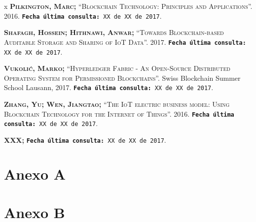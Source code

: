 \documentclass[12pt,a4paper, twoside]{report}
\makeatletter
\newcommand{\blankpage}{
				\newpage
				\thispagestyle{empty}
				\mbox{}
				\newpage
				}
\let\plainappendixpage\appendixpage
\renewcommand{\appendixpage}{%
  \begingroup
  \let\ps@plain\ps@empty
  \plainappendixpage
  \endgroup}
\makeatother
\begin{document}
\begin{thebibliography} {x}
		 \textsc{\textbf{Pilkington, Marc; }}\textsc{“Blockchain Technology: Principles and Applications”.} 2016.
		\newline \texttt{\textbf{Fecha última consulta:} XX de XX de 2017}.
		
		 \textsc{\textbf{Shafagh, Hossein; Hithnawi, Anwar; }}\textsc{“Towards Blockchain-based Auditable Storage and Sharing of IoT Data”.} 2017.
		\newline \texttt{\textbf{Fecha última consulta:} XX de XX de 2017}.
		
		 \textsc{\textbf{Vukolić, Marko; }}\textsc{“Hyperledger Fabric - An Open-Source Distributed Operating System for Permissioned Blockchains”.} Swiss Blockchain Summer School Lausann, 2017.
		\newline \texttt{\textbf{Fecha última consulta:} XX de XX de 2017}.
		
		 \textsc{\textbf{Zhang, Yu; Wen, Jiangtao; }}\textsc{“The IoT electric business model: Using Blockchain Technology for the Internet of Things”.} 2016.
		\newline \texttt{\textbf{Fecha última consulta:} XX de XX de 2017}.
																				
		 \textsc{\textbf{XXX; }}
		\newline \texttt{\textbf{Fecha última consulta:} XX de XX de 2017}.
						
		\endgroup
	\end{thebibliography}
	
	\thispagestyle{empty}
		
	\renewcommand{\appendixname}{Anexo}
	\renewcommand{\appendixtocname}{Anexos}
	\renewcommand{\appendixpagename}{ANEXOS} 
	\appendix 
	\addappheadtotoc 
	\appendixpage 
	
	\blankpage

	\chapter{Anexo A}\label{AnnexeA}

	\chapter{Anexo B}\label{AnnexeB}
	
\end{document}
